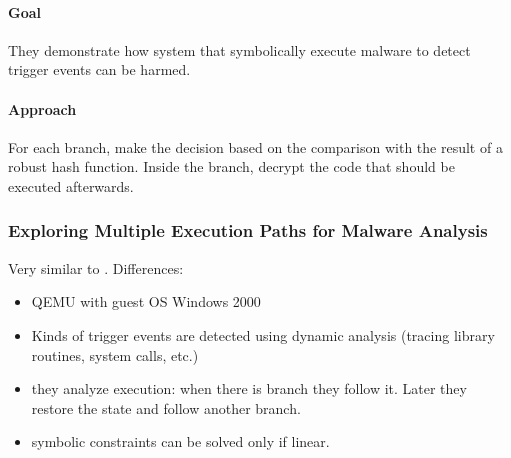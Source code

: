 \paragraph{Goal}
They demonstrate how system that symbolically execute malware to detect trigger events can be harmed.

\paragraph{Approach}
For each branch, make the decision based on the comparison with the result of a robust hash function. Inside the branch, decrypt the code that should be executed afterwards.

\subsubsection{\cite{MKK-SP07} Exploring Multiple Execution Paths for Malware Analysis} 

Very similar to \cite{MineSweeper-BOTNET08}. Differences:
\begin{itemize}
  \item QEMU with guest OS Windows 2000
  \item Kinds of trigger events are detected using dynamic analysis (tracing library routines, system calls, etc.)
  \item they analyze execution: when there is branch they follow it. Later they restore the state and follow another branch.
  \item symbolic constraints can be solved only if linear.
\end{itemize}

\begin{comment}

\subsubsection{\cite{}} 

\paragraph{Goal}
\paragraph{Approach}

\begin{itemize}
  \item test
\end{itemize}

\begin{enumerate}
  \item test
\end{enumerate}

\begin{lstlisting}
\end{lstlisting}

\end{comment}

